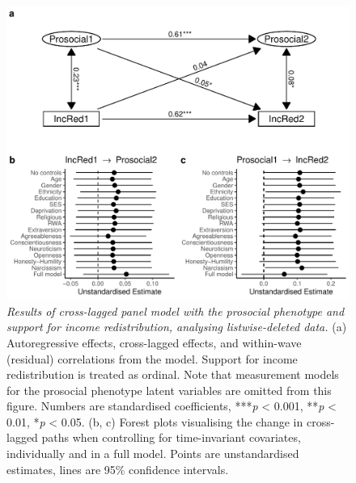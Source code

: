\documentclass[
  man,floatsintext]{apa6}
\begin{document}
\begin{figure}
\centering
\includegraphics{manuscript_files/figure-latex/clpmPlotIncReddReduced-1.pdf}
\caption{\label{fig:clpmPlotIncReddReduced}\emph{Results of cross-lagged panel model with the
prosocial phenotype and support for income redistribution, analysing
listwise-deleted data.} (a) Autoregressive effects, cross-lagged effects, and
within-wave (residual) correlations from the model. Support for income
redistribution is treated as ordinal. Note that measurement models for the
prosocial phenotype latent variables are omitted from this figure. Numbers are
standardised coefficients, ***\emph{p} \textless{} 0.001, **\emph{p} \textless{} 0.01, *\emph{p} \textless{} 0.05.
(b, c) Forest plots visualising the change in cross-lagged paths when
controlling for time-invariant covariates, individually and in a full model.
Points are unstandardised estimates, lines are 95\% confidence intervals.}
\end{figure}

\newpage
\end{document}
